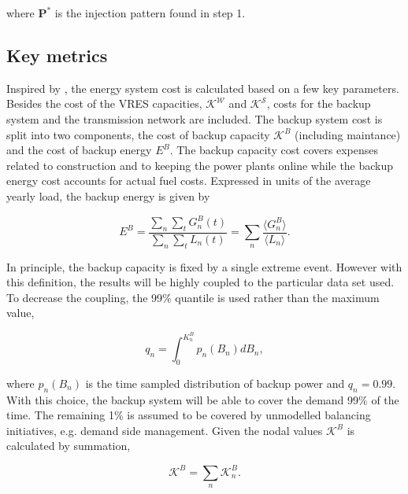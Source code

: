 \documentclass[a4paper, 5p, sort&compress]{elsarticle}%
\begin{document}
where $\mathbf{P}^{*}$ is the injection pattern found in step 1.


\subsection{Key metrics}

Inspired by \cite{Sensitivity}, the energy system cost is calculated
based on a few key parameters. Besides the cost of the VRES
capacities, $\mathcal{K^{W}}$ and $\mathcal{K^S}$, costs for the
backup system and the transmission network are included. The backup
system cost is split into two components, the cost of backup capacity
$\mathcal{K}^{B}$ (including maintance) and the cost of backup energy
$E^{B}$. The backup capacity cost covers expenses related to
construction and to keeping the power plants online while the backup
energy cost accounts for actual fuel costs. Expressed in units of
the average yearly load, the backup energy is given by

\begin{equation}
  \label{eq:backup-energy}
  E^{B} =\frac{\sum_{n} \sum_{t} G^{B}_{n}(t)}{\sum_{n} \sum_{t}
    L_{n}(t)} = \sum_{n} \frac{\langle G^{B}_{n} \rangle}{\langle L_{n}
    \rangle} .
\end{equation}

In principle, the backup capacity is fixed by a single extreme
event. However with this definition, the results will be highly
coupled to the particular data set used. To decrease the coupling, the
99\% quantile is used rather than the maximum value,

\begin{equation}
  \label{eq:2}
  q_{n} = \int _{0} ^{K_{n}^{B}} p_{n}(B_{n})dB_{n},
\end{equation}

where $p_{n}(B_{n})$ is the time sampled distribution of backup power
and $q_{n} = 0.99$. With this choice, the backup system will be able
to cover the demand 99\% of the time. The remaining 1\% is assumed to
be covered by unmodelled balancing initiatives, e.g. demand side
management. Given the nodal values $\mathcal{K}^{B}$ is calculated by
summation,

\begin{equation}
  \label{eq:4}
  \mathcal{K}^{B} = \sum_{n} \mathcal{K}^{B}_{n} .
\end{equation}
\end{document}
